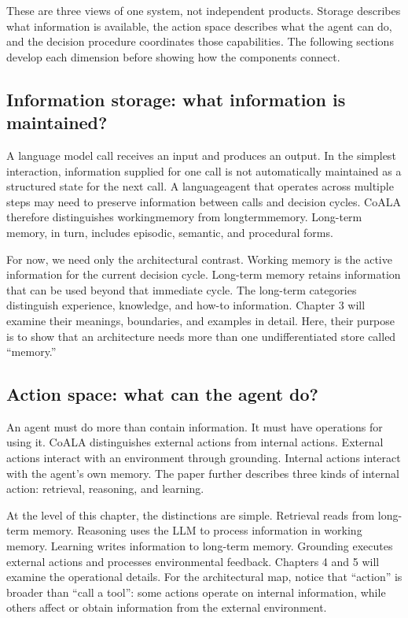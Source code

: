 These are three views of one system, not independent products. Storage describes what information is available, the action space describes what the agent can do, and the decision procedure coordinates those capabilities. The following sections develop each dimension before showing how the components connect.

\subsection{Information storage: what information is maintained?}

A language model call receives an input and produces an output. In the simplest interaction, information supplied for one call is not automatically maintained as a structured state for the next call. A \gls{languageagent} that operates across multiple steps may need to preserve information between calls and decision cycles. CoALA therefore distinguishes \gls{workingmemory} from \gls{longtermmemory}. Long-term memory, in turn, includes episodic, semantic, and procedural forms.

For now, we need only the architectural contrast. Working memory is the active information for the current decision cycle. Long-term memory retains information that can be used beyond that immediate cycle. The long-term categories distinguish experience, knowledge, and how-to information. Chapter 3 will examine their meanings, boundaries, and examples in detail. Here, their purpose is to show that an architecture needs more than one undifferentiated store called “memory.”

\subsection{Action space: what can the agent do?}

An agent must do more than contain information. It must have operations for using it. CoALA distinguishes external actions from internal actions. External actions interact with an environment through grounding. Internal actions interact with the agent's own memory. The paper further describes three kinds of internal action: retrieval, reasoning, and learning.

At the level of this chapter, the distinctions are simple. Retrieval reads from long-term memory. Reasoning uses the LLM to process information in working memory. Learning writes information to long-term memory. Grounding executes external actions and processes environmental feedback. Chapters 4 and 5 will examine the operational details. For the architectural map, notice that “action” is broader than “call a tool”: some actions operate on internal information, while others affect or obtain information from the external environment.


